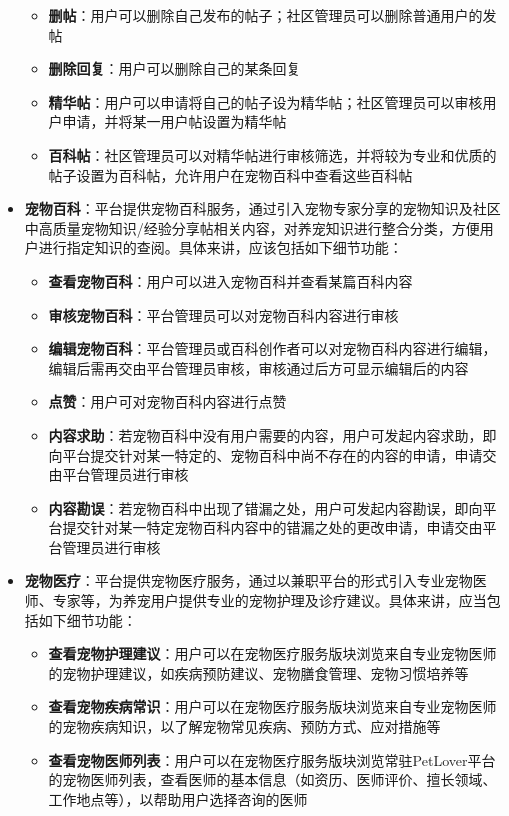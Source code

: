 \documentclass[a4paper]{ctexart}
\begin{document}
\begin{itemize}
\begin{itemize}
    \item \textbf{删帖}：用户可以删除自己发布的帖子；社区管理员可以删除普通用户的发帖
    \item \textbf{删除回复}：用户可以删除自己的某条回复
    \item \textbf{精华帖}：用户可以申请将自己的帖子设为精华帖；社区管理员可以审核用户申请，并将某一用户帖设置为精华帖
    \item \textbf{百科帖}：社区管理员可以对精华帖进行审核筛选，并将较为专业和优质的帖子设置为百科帖，允许用户在宠物百科中查看这些百科帖
  \end{itemize}
  \item \textbf{宠物百科}：平台提供宠物百科服务，通过引入宠物专家分享的宠物知识及社区中高质量宠物知识/经验分享帖相关内容，对养宠知识进行整合分类，方便用户进行指定知识的查阅。具体来讲，应该包括如下细节功能：
  \begin{itemize}
    \item \textbf{查看宠物百科}：用户可以进入宠物百科并查看某篇百科内容
    \item \textbf{审核宠物百科}：平台管理员可以对宠物百科内容进行审核
    \item \textbf{编辑宠物百科}：平台管理员或百科创作者可以对宠物百科内容进行编辑，编辑后需再交由平台管理员审核，审核通过后方可显示编辑后的内容
    \item \textbf{点赞}：用户可对宠物百科内容进行点赞
    \item \textbf{内容求助}：若宠物百科中没有用户需要的内容，用户可发起内容求助，即向平台提交针对某一特定的、宠物百科中尚不存在的内容的申请，申请交由平台管理员进行审核
    \item \textbf{内容勘误}：若宠物百科中出现了错漏之处，用户可发起内容勘误，即向平台提交针对某一特定宠物百科内容中的错漏之处的更改申请，申请交由平台管理员进行审核
  \end{itemize}
  \item \textbf{宠物医疗}：平台提供宠物医疗服务，通过以兼职平台的形式引入专业宠物医师、专家等，为养宠用户提供专业的宠物护理及诊疗建议。具体来讲，应当包括如下细节功能：
  \begin{itemize}
    \item \textbf{查看宠物护理建议}：用户可以在宠物医疗服务版块浏览来自专业宠物医师的宠物护理建议，如疾病预防建议、宠物膳食管理、宠物习惯培养等
    \item \textbf{查看宠物疾病常识}：用户可以在宠物医疗服务版块浏览来自专业宠物医师的宠物疾病知识，以了解宠物常见疾病、预防方式、应对措施等
    \item \textbf{查看宠物医师列表}：用户可以在宠物医疗服务版块浏览常驻PetLover平台的宠物医师列表，查看医师的基本信息（如资历、医师评价、擅长领域、工作地点等），以帮助用户选择咨询的医师

\end{itemize}
\end{itemize}
\end{document}
